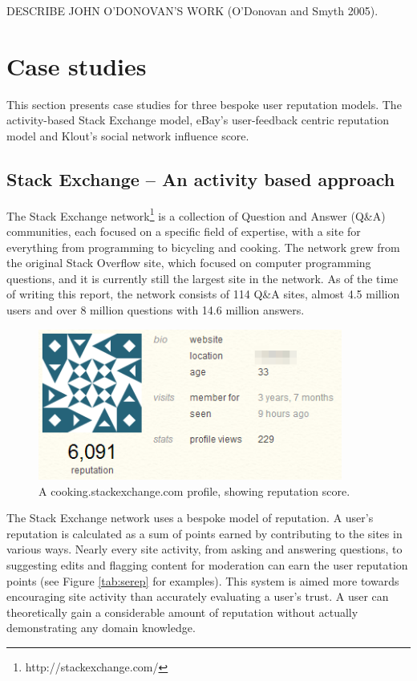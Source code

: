 \documentclass[]{final_report}
\begin{document}
DESCRIBE JOHN O'DONOVAN'S WORK (O'Donovan and Smyth 2005).

\section{Case studies}

This section presents case studies for three bespoke user reputation models. The activity-based Stack Exchange model, eBay's user-feedback centric reputation model and Klout's social network influence score.

\subsection{Stack Exchange -- An activity based approach}

The Stack Exchange network\footnote{http://stackexchange.com/} is a collection of Question and Answer (Q\&A) communities, each focused on a specific field of expertise, with a site for everything from programming to bicycling and cooking. The network grew from the original Stack Overflow site, which focused on computer programming questions, and it is currently still the largest site in the network. As of the time of writing this report, the network consists of 114 Q\&A sites, almost 4.5 million users and over 8 million questions with 14.6 million answers.

\begin{figure}[ht!]
\centering
\includegraphics[width=100mm]{chap2/serep.png}
\caption{A cooking.stackexchange.com profile, showing reputation score.}
\end{figure}\label{gra:serep}

The Stack Exchange network uses a bespoke model of reputation. A user's reputation is calculated as a sum of points earned by contributing to the sites in various ways. Nearly every site activity, from asking and answering questions, to suggesting edits and flagging content for moderation can earn the user reputation points (see Figure \ref{tab:serep} for examples). This system is aimed more towards encouraging site activity than accurately evaluating a user's trust. A user can theoretically gain a considerable amount of reputation without actually demonstrating any domain knowledge.
\end{document}
